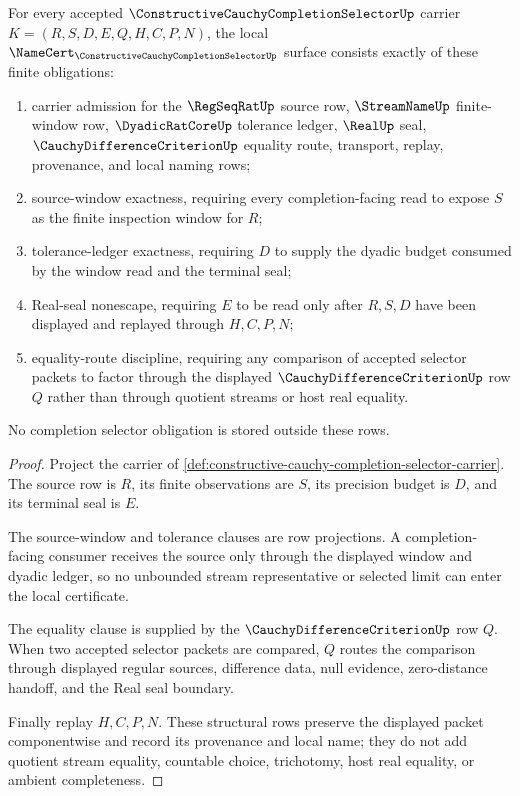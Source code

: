 \begin{theorem}
\label{thm:constructive-cauchy-completion-selector-namecert-obligations}
For every accepted $\ConstructiveCauchyCompletionSelectorUp$ carrier $K=(R,S,D,E,Q,H,C,P,N)$, the local $\NameCert_{\ConstructiveCauchyCompletionSelectorUp}$ surface consists exactly of these finite obligations:
\begin{enumerate}
\item carrier admission for the $\RegSeqRatUp$ source row, $\StreamNameUp$ finite-window row, $\DyadicRatCoreUp$ tolerance ledger, $\RealUp$ seal, $\CauchyDifferenceCriterionUp$ equality route, transport, replay, provenance, and local naming rows;
\item source-window exactness, requiring every completion-facing read to expose $S$ as the finite inspection window for $R$;
\item tolerance-ledger exactness, requiring $D$ to supply the dyadic budget consumed by the window read and the terminal seal;
\item Real-seal nonescape, requiring $E$ to be read only after $R,S,D$ have been displayed and replayed through $H,C,P,N$;
\item equality-route discipline, requiring any comparison of accepted selector packets to factor through the displayed $\CauchyDifferenceCriterionUp$ row $Q$ rather than through quotient streams or host real equality.
\end{enumerate}
No completion selector obligation is stored outside these rows.
\end{theorem}
\begin{proof}
Project the carrier of \autoref{def:constructive-cauchy-completion-selector-carrier}. The source row is $R$, its finite observations are $S$, its precision budget is $D$, and its terminal seal is $E$.

The source-window and tolerance clauses are row projections. A completion-facing consumer receives the source only through the displayed window and dyadic ledger, so no unbounded stream representative or selected limit can enter the local certificate.

The equality clause is supplied by the $\CauchyDifferenceCriterionUp$ row $Q$. When two accepted selector packets are compared, $Q$ routes the comparison through displayed regular sources, difference data, null evidence, zero-distance handoff, and the Real seal boundary.

Finally replay $H,C,P,N$. These structural rows preserve the displayed packet componentwise and record its provenance and local name; they do not add quotient stream equality, countable choice, trichotomy, host real equality, or ambient completeness.
\end{proof}


